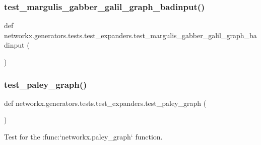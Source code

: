 \subsubsection{\texorpdfstring{test\+\_\+margulis\+\_\+gabber\+\_\+galil\+\_\+graph\+\_\+badinput()}{test\_margulis\_gabber\_galil\_graph\_badinput()}}
{\footnotesize\ttfamily def networkx.\+generators.\+tests.\+test\+\_\+expanders.\+test\+\_\+margulis\+\_\+gabber\+\_\+galil\+\_\+graph\+\_\+badinput (\begin{DoxyParamCaption}{ }\end{DoxyParamCaption})}

\mbox{\label{namespacenetworkx_1_1generators_1_1tests_1_1test__expanders_a30eefd1f319a39e0510e2f7738b2bbf4}} 
\subsubsection{\texorpdfstring{test\+\_\+paley\+\_\+graph()}{test\_paley\_graph()}}
{\footnotesize\ttfamily def networkx.\+generators.\+tests.\+test\+\_\+expanders.\+test\+\_\+paley\+\_\+graph (\begin{DoxyParamCaption}{ }\end{DoxyParamCaption})}

\begin{DoxyVerb}Test for the :func:`networkx.paley_graph` function.\end{DoxyVerb}
 